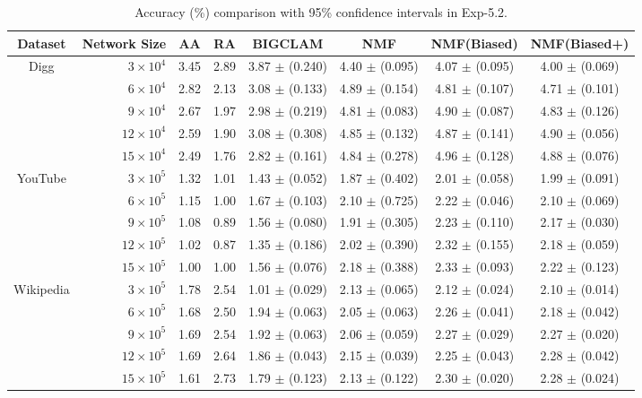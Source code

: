 \documentclass[10pt,journal,compsoc]{IEEEtran}
\newcommand{\NMF}{{\sf NMF}\xspace }
\newcommand{\Biased}{{\sf NMF(Biased)}\xspace}
\newcommand{\Aa}{{\sf AA}\xspace }
\newcommand{\RA}{{\sf RA}\xspace }
\newcommand{\BIGCLAM}{{\sf BIGCLAM}\xspace}
\newcommand{\Digg}{{\sf Digg}\xspace}
\newcommand{\YouTube}{{\sf YouTube}\xspace}
\newcommand{\Wikipedia}{{\sf Wikipedia}\xspace}
\newcommand{\Biasedp}{{\sf NMF(Biased+)}\xspace}
\begin{document}
\begin{table}
\caption{Accuracy (\%) comparison with 95\% confidence intervals in Exp-5.2.}
\label{tab_accuracy_8}
\vspace{-2ex}
\centering
\newcommand{\tabincell}[2]{\begin{tabular}{@{}#1@{}}#2\end{tabular}}
\begin{tabular}{c|r|c|c|c|c|c|c}
\hline \hline Dataset  & Network Size & \Aa & \RA & \BIGCLAM & \NMF & \Biased & \Biasedp  \\
\hline
\multirow{5}{*}{\Digg}
 & $3 \times 10^4 $  & 3.45 & 2.89 & 3.87 $\pm$ (0.240) & 4.40 $\pm$ (0.095) & 4.07 $\pm$ (0.095) & 4.00 $\pm$ (0.069) \\
 & $6 \times 10^4 $  & 2.82 & 2.13 & 3.08 $\pm$ (0.133) & 4.89 $\pm$ (0.154) & 4.81 $\pm$ (0.107) & 4.71 $\pm$ (0.101)  \\
 & $9 \times 10^4 $  & 2.67 & 1.97 & 2.98 $\pm$ (0.219) & 4.81 $\pm$ (0.083) & 4.90 $\pm$ (0.087) & 4.83 $\pm$ (0.126)  \\
 & $12 \times 10^4 $ & 2.59 & 1.90 & 3.08 $\pm$ (0.308) & 4.85 $\pm$ (0.132) & 4.87 $\pm$ (0.141) & 4.90 $\pm$ (0.056) \\
 & $15 \times 10^4 $ & 2.49 & 1.76 & 2.82 $\pm$ (0.161) & 4.84 $\pm$ (0.278) & 4.96 $\pm$ (0.128) & 4.88 $\pm$ (0.076)  \\
\hline
\multirow{5}{*}{\YouTube}
 & $3 \times 10^5 $  & 1.32 & 1.01 & 1.43 $\pm$ (0.052) & 1.87 $\pm$ (0.402) & 2.01 $\pm$ (0.058) & 1.99 $\pm$ (0.091)  \\
 & $6 \times 10^5 $  & 1.15 & 1.00 & 1.67 $\pm$ (0.103) & 2.10 $\pm$ (0.725) & 2.22 $\pm$ (0.046) & 2.10 $\pm$ (0.069)  \\
 & $9 \times 10^5 $  & 1.08 & 0.89 & 1.56 $\pm$ (0.080) & 1.91 $\pm$ (0.305) & 2.23 $\pm$ (0.110) & 2.17 $\pm$ (0.030)  \\
 & $12 \times 10^5 $ & 1.02 & 0.87 & 1.35 $\pm$ (0.186) & 2.02 $\pm$ (0.390) & 2.32 $\pm$ (0.155) & 2.18 $\pm$ (0.059)  \\
 & $15 \times 10^5 $ & 1.00 & 1.00 & 1.56 $\pm$ (0.076) & 2.18 $\pm$ (0.388) & 2.33 $\pm$ (0.093) & 2.22 $\pm$ (0.123)  \\
\hline
\multirow{5}{*}{\Wikipedia}
 & $3 \times 10^5 $  & 1.78 & 2.54 & 1.01 $\pm$ (0.029) & 2.13 $\pm$ (0.065) & 2.12 $\pm$ (0.024) & 2.10 $\pm$ (0.014)  \\
 & $6 \times 10^5 $  & 1.68 & 2.50 & 1.94 $\pm$ (0.063) & 2.05 $\pm$ (0.063) & 2.26 $\pm$ (0.041) & 2.18 $\pm$ (0.042)  \\
 & $9 \times 10^5 $  & 1.69 & 2.54 & 1.92 $\pm$ (0.063) & 2.06 $\pm$ (0.059) & 2.27 $\pm$ (0.029) & 2.27 $\pm$ (0.020)  \\
 & $12 \times 10^5 $ & 1.69 & 2.64 & 1.86 $\pm$ (0.043) & 2.15 $\pm$ (0.039) & 2.25 $\pm$ (0.043) & 2.28 $\pm$ (0.042)  \\
 & $15 \times 10^5 $ & 1.61 & 2.73 & 1.79 $\pm$ (0.123) & 2.13 $\pm$ (0.122) & 2.30 $\pm$ (0.020) & 2.28 $\pm$ (0.024) \\
\hline \hline
\end{tabular}
\vspace{-2ex}
\end{table}
\end{document}
